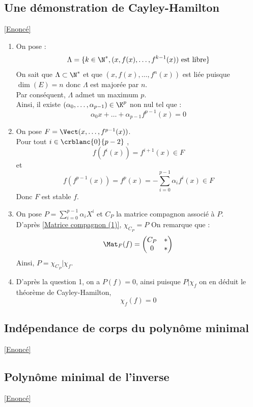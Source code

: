 \documentclass[8pt]{book}
\begin{document}
	\subsection{Une démonstration de Cayley-Hamilton}
	\label{Une démonstration de Cayley-Hamilton corrigé}
	\textcolor{blue}{\hyperref[Une démonstration de Cayley_Hamilton]{[Enoncé]}}\\
	\begin{enumerate}
		\item On pose :
		\[\Lambda=\{k\in\N^*, (x,f(x),\dots,f^{k-1}(x)) \text{ est libre}\}\]
		On sait que $\Lambda\subset \N^*$ et que $(x,f(x),\dots,f^n(x))$ est liée puisque $\dim(E)=n$ donc $\Lambda$ est majorée par $n$.\\
		Par conséquent, $\Lambda$ admet un maximum $p$.\\
		Ainsi, il existe $(\alpha_0,\dots,\alpha_{p-1})\in\K^p$ non nul tel que :
		\[\alpha_0x+\dots+\alpha_{p-1}f^{p-1}(x)=0\] 
		\item On pose $F=\Vect(x,\dots,f^{p-1}(x))$.\\
		Pour tout $i\in\crblanc{0}{p-2}$ ,\[f(f^i(x))=f^{i+1}(x)\in F\]
		et \[f(f^{p-1}(x))=f^p(x)=-\sum_{i=0}^{p-1}\alpha_if^i(x)\in F\]
		Donc $F$ est stable $f$.
		\item On pose $P=\sum_{i=0}^{p-1}\alpha_i X^i$ et $C_P$ la matrice compagnon associé à $P$.\\ D'après \ref{Matrice compagnon (1)}, $\chi_{C_P}=P$
		On remarque que :
		\[\Mat_F(f)=\begin{pmatrix}
			C_P&*\\0&*
		\end{pmatrix}\]
		Ainsi, $P=\chi_{C_P}|\chi_f$.
		\item D'après la question 1, on a $P(f)=0$, ainsi puisque $P|\chi_f$ on en déduit le théorème de Cayley-Hamilton, \[\chi_f(f)=0\]
	\end{enumerate}
	\subsection{Indépendance de corps du polynôme minimal}
	\label{Indépendance de corps du polynôme minimal corrigé}
	\textcolor{blue}{\hyperref[Indépendance de corps du polynôme minimal]{[Enoncé]}}\\
	
	\subsection{Polynôme minimal de l'inverse}
	\label{Polynôme minimal de l'inverse corrigé}
	\textcolor{blue}{\hyperref[Polynôme minimal de l'inverse]{[Enoncé]}}\\
	
\end{document}
